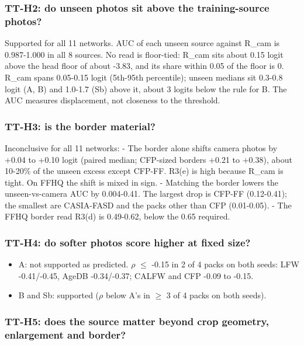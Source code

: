 \documentclass[10pt,twocolumn,letterpaper]{article}
\providecommand{\tightlist}{\setlength{\itemsep}{0pt}\setlength{\parskip}{0pt}}
\begin{document}
\subsubsection{TT-H2: do unseen photos sit above the training-source photos?}\label{tt-h2-do-unseen-photos-sit-above-the-training-source-photos}

Supported for all 11 networks. AUC of each unseen source against R\_cam is 0.987-1.000 in all 8 sources. No read is floor-tied: R\_cam sits about 0.15 logit above the head floor of about -3.83, and its share within 0.05 of the floor is 0. R\_cam spans 0.05-0.15 logit (5th-95th percentile); unseen medians sit 0.3-0.8 logit (A, B) and 1.0-1.7 (Sb) above it, about 3 logits below the rule for B. The AUC measures displacement, not closeness to the threshold.

\subsubsection{TT-H3: is the border material?}\label{tt-h3-is-the-border-material}

Inconclusive for all 11 networks: - The border alone shifts camera photos by +0.04 to +0.10 logit (paired median; CFP-sized borders +0.21 to +0.38), about 10-20\% of the unseen excess except CFP-FF. R3(e) is high because R\_cam is tight. On FFHQ the shift is mixed in sign. - Matching the border lowers the unseen-vs-camera AUC by 0.004-0.41. The largest drop is CFP-FF (0.12-0.41); the smallest are CASIA-FASD and the packs other than CFP (0.01-0.05). - The FFHQ border read R3(d) is 0.49-0.62, below the 0.65 required.

\subsubsection{TT-H4: do softer photos score higher at fixed size?}\label{tt-h4-do-softer-photos-score-higher-at-fixed-size}

\begin{itemize}
\tightlist
\item
  A: not supported as predicted. \(\rho\) \(\le\) -0.15 in 2 of 4 packs on both seeds: LFW -0.41/-0.45, AgeDB -0.34/-0.37; CALFW and CFP -0.09 to -0.15.
\item
  B and Sb: supported (\textbar{}\(\rho\)\textbar{} below A's in \(\ge\) 3 of 4 packs on both seeds).
\end{itemize}

\subsubsection{TT-H5: does the source matter beyond crop geometry, enlargement and border?}\label{tt-h5-does-the-source-matter-beyond-crop-geometry-enlargement-and-border}
\end{document}
